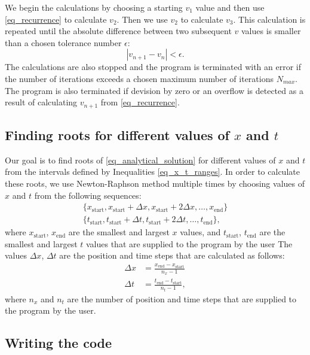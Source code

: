 We begin the calculations by choosing a starting $v_1$ value and then use \autoref{eq_recurrence} to calculate $v_2$. Then we use $v_2$ to calculate $v_3$. This calculation is repeated until the absolute difference between two subsequent $v$ values is smaller than a chosen tolerance number $\epsilon$:
\[
  |{v_{n+1} - v_n}| < \epsilon.
\]
The calculations are also stopped and the program is terminated with an error if the number of iterations exceeds a chosen maximum number of iterations $N_{max}$. The program is also terminated if devision by zero or an overflow is detected as a result of calculating $v_{n+1}$ from \autoref{eq_recurrence}.

\subsection{Finding roots for different values of $x$ and $t$}

Our goal is to find roots of \autoref{eq_analytical_solution} for different values of $x$ and $t$ from the intervals defined by Inequalities \ref{eq_x_t_ranges}. In order to calculate these roots, we use Newton-Raphson method multiple times by choosing values of $x$ and $t$ from the following sequences:
\begin{align*}
  \{ x_{\textrm{start}}, x_{\textrm{start}} + \Delta x, x_{\textrm{start}} + 2 \Delta x, \dots, x_{\textrm{end}} \} \\
  \{ t_{\textrm{start}}, t_{\textrm{start}} + \Delta t, t_{\textrm{start}} + 2 \Delta t, \dots, t_{\textrm{end}} \},
\end{align*}
where $x_{\textrm{start}}$, $x_{\textrm{end}}$ are the smallest and largest $x$ values, and $t_{\textrm{start}}$, $t_{\textrm{end}}$ are the smallest and largest $t$ values that are supplied to the program by the user The values $\Delta x$, $\Delta t$ are the position and time steps that are calculated as follows:
\begin{align}
  \Delta x &= \frac{x_{\textrm{end}} - x_{\textrm{start}}}{n_x - 1} \label{eq_dx} \\
  \Delta t &= \frac{t_{\textrm{end}} - t_{\textrm{start}}}{n_t - 1}, \label{eq_dt}
\end{align}
where $n_x$ and $n_t$ are the number of position and time steps that are supplied to the program by the user.


\subsection{Writing the code}

